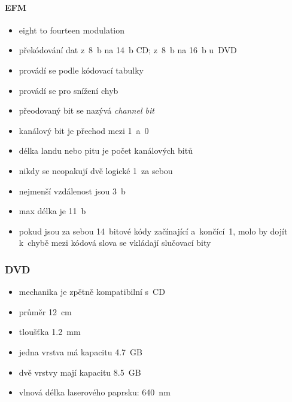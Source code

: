 \documentclass[a4paper,12pt]{article}
\providecommand{\tightlist}{%
\setlength{\itemsep}{0pt}\setlength{\parskip}{0pt}}
\begin{document}
\paragraph{EFM}

\begin{itemize}
  \tightlist
  \item eight to fourteen modulation
  \item překódování dat z~8~b na 14~b CD; z~8~b na 16~b u~DVD
  \item provádí se podle kódovací tabulky
  \item provádí se pro snížení chyb
  \item přeodovaný bit se nazývá \emph{channel bit}
  \item kanálový bit je přechod mezi 1~a~0
  \item délka landu nebo pitu je počet kanálových bitů
  \item nikdy se neopakují dvě logické 1~za sebou
  \item nejmenší vzdálenost jsou 3~b
  \item max délka je 11~b
  \item pokud jsou za sebou 14~bitové kódy začínající a~končící~1, molo by dojít
  k~chybě \textrightarrow{} mezi kódová slova se vkládají slučovací bity
\end{itemize}

\subsubsection{DVD}

\begin{itemize}
  \tightlist
  \item mechanika je zpětně kompatibilní s~CD
  \item průměr 12~cm
  \item tloušťka 1.2~mm
  \item jedna vrstva má kapacitu 4.7~GB
  \item dvě vrstvy mají kapacitu 8.5~GB
  \item vlnová délka laserového paprsku: 640~nm
\end{itemize}
\end{document}
